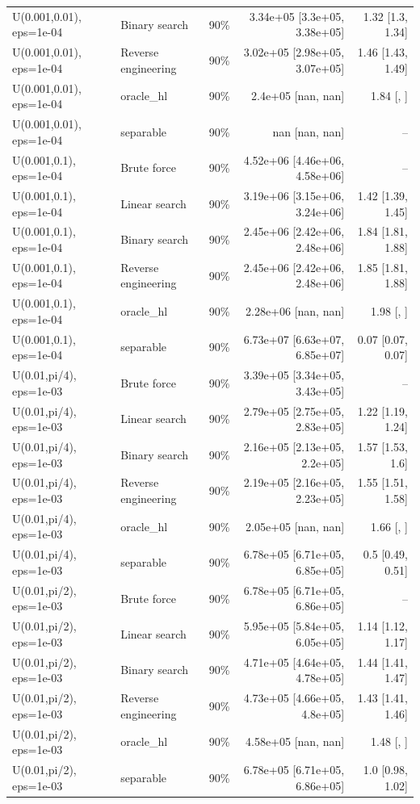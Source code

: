 \begin{tabular}{llrrr}
U(0.001,0.01), eps=1e-04 & Binary search & 90\% & 3.34e+05 [3.3e+05, 3.38e+05] & 1.32 [1.3, 1.34] \\
U(0.001,0.01), eps=1e-04 & Reverse engineering & 90\% & 3.02e+05 [2.98e+05, 3.07e+05] & 1.46 [1.43, 1.49] \\
U(0.001,0.01), eps=1e-04 & oracle_hl & 90\% & 2.4e+05 [nan, nan] & 1.84 [, ] \\
U(0.001,0.01), eps=1e-04 & separable & 90\% & nan [nan, nan] & -- \\
U(0.001,0.1), eps=1e-04 & Brute force & 90\% & 4.52e+06 [4.46e+06, 4.58e+06] & -- \\
U(0.001,0.1), eps=1e-04 & Linear search & 90\% & 3.19e+06 [3.15e+06, 3.24e+06] & 1.42 [1.39, 1.45] \\
U(0.001,0.1), eps=1e-04 & Binary search & 90\% & 2.45e+06 [2.42e+06, 2.48e+06] & 1.84 [1.81, 1.88] \\
U(0.001,0.1), eps=1e-04 & Reverse engineering & 90\% & 2.45e+06 [2.42e+06, 2.48e+06] & 1.85 [1.81, 1.88] \\
U(0.001,0.1), eps=1e-04 & oracle_hl & 90\% & 2.28e+06 [nan, nan] & 1.98 [, ] \\
U(0.001,0.1), eps=1e-04 & separable & 90\% & 6.73e+07 [6.63e+07, 6.85e+07] & 0.07 [0.07, 0.07] \\
U(0.01,pi/4), eps=1e-03 & Brute force & 90\% & 3.39e+05 [3.34e+05, 3.43e+05] & -- \\
U(0.01,pi/4), eps=1e-03 & Linear search & 90\% & 2.79e+05 [2.75e+05, 2.83e+05] & 1.22 [1.19, 1.24] \\
U(0.01,pi/4), eps=1e-03 & Binary search & 90\% & 2.16e+05 [2.13e+05, 2.2e+05] & 1.57 [1.53, 1.6] \\
U(0.01,pi/4), eps=1e-03 & Reverse engineering & 90\% & 2.19e+05 [2.16e+05, 2.23e+05] & 1.55 [1.51, 1.58] \\
U(0.01,pi/4), eps=1e-03 & oracle_hl & 90\% & 2.05e+05 [nan, nan] & 1.66 [, ] \\
U(0.01,pi/4), eps=1e-03 & separable & 90\% & 6.78e+05 [6.71e+05, 6.85e+05] & 0.5 [0.49, 0.51] \\
U(0.01,pi/2), eps=1e-03 & Brute force & 90\% & 6.78e+05 [6.71e+05, 6.86e+05] & -- \\
U(0.01,pi/2), eps=1e-03 & Linear search & 90\% & 5.95e+05 [5.84e+05, 6.05e+05] & 1.14 [1.12, 1.17] \\
U(0.01,pi/2), eps=1e-03 & Binary search & 90\% & 4.71e+05 [4.64e+05, 4.78e+05] & 1.44 [1.41, 1.47] \\
U(0.01,pi/2), eps=1e-03 & Reverse engineering & 90\% & 4.73e+05 [4.66e+05, 4.8e+05] & 1.43 [1.41, 1.46] \\
U(0.01,pi/2), eps=1e-03 & oracle_hl & 90\% & 4.58e+05 [nan, nan] & 1.48 [, ] \\
U(0.01,pi/2), eps=1e-03 & separable & 90\% & 6.78e+05 [6.71e+05, 6.86e+05] & 1.0 [0.98, 1.02] \\
\bottomrule
\end{tabular}
